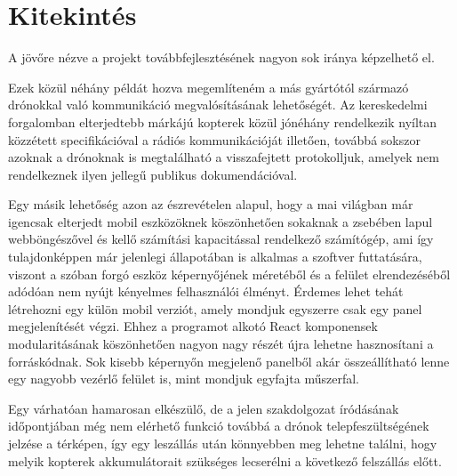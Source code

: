 \section{Kitekintés}

A jövőre nézve a projekt továbbfejlesztésének nagyon sok iránya képzelhető el.

Ezek közül néhány példát hozva megemlíteném a más gyártótól származó drónokkal
való kommunikáció megvalósításának lehetőségét. Az kereskedelmi forgalomban
elterjedtebb márkájú kopterek közül jónéhány rendelkezik nyíltan közzétett
specifikációval a rádiós kommunikációját illetően, továbbá sokszor azoknak a
drónoknak is megtalálható a visszafejtett protokolljuk, amelyek nem rendelkeznek
ilyen jellegű publikus dokumendációval.

Egy másik lehetőség azon az észrevételen alapul, hogy a mai világban már
igencsak elterjedt mobil eszközöknek köszönhetően sokaknak a zsebében lapul
webböngészővel és kellő számítási kapacitással rendelkező számítógép, ami így
tulajdonképpen már jelenlegi állapotában is alkalmas a szoftver futtatására,
viszont a szóban forgó eszköz képernyőjének méretéből és a felület
elrendezéséből adódóan nem nyújt kényelmes felhasználói élményt. Érdemes lehet
tehát létrehozni egy külön mobil verziót, amely mondjuk egyszerre csak egy panel
megjelenítését végzi. Ehhez a programot alkotó React komponensek modularitásának
köszönhetően nagyon nagy részét újra lehetne hasznosítani a forráskódnak. Sok
kisebb képernyőn megjelenő panelből akár összeállítható lenne egy nagyobb
vezérlő felület is, mint mondjuk egyfajta műszerfal.

Egy várhatóan hamarosan elkészülő, de a jelen szakdolgozat íródásának
időpontjában még nem elérhető funkció továbbá a drónok telepfeszültségének
jelzése a térképen, így egy leszállás után könnyebben meg lehetne találni, hogy
melyik kopterek akkumulátorait szükséges lecserélni a következő felszállás
előtt.
